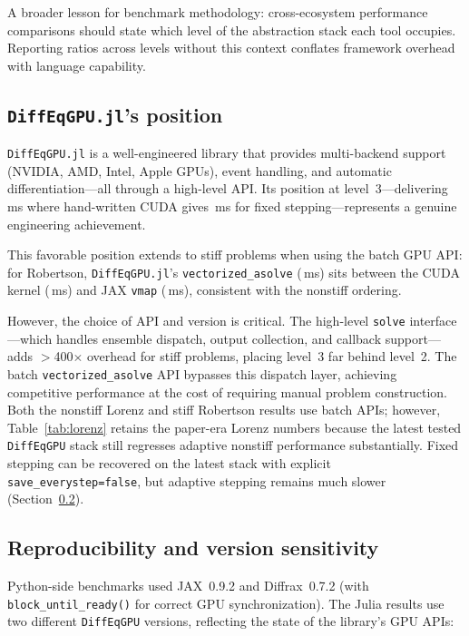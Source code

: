 \documentclass[11pt]{article}
\begin{document}
A broader lesson for benchmark methodology: cross-ecosystem
performance comparisons should state which level of the
abstraction stack each tool occupies.
Reporting ratios across levels without this context conflates
framework overhead with language capability.

\subsection{\texttt{DiffEqGPU.jl}'s position}

\texttt{DiffEqGPU.jl} is a well-engineered library that provides
multi-backend support (NVIDIA, AMD, Intel, Apple GPUs),
event handling, and automatic differentiation---all through a
high-level API.
Its position at level~3---delivering \JuliaLorenzFixed\,ms where hand-written
CUDA gives \CUDALorenzFixed\,ms for fixed stepping---represents a genuine
engineering achievement.

This favorable position extends to stiff problems when using
the batch GPU API: for Robertson, \texttt{DiffEqGPU.jl}'s
\texttt{vectorized\_asolve} (\JuliaRobertson\,ms) sits between
the CUDA kernel (\CUDARobertson\,ms) and JAX \texttt{vmap}
(\JAXRobertson\,ms), consistent with the nonstiff ordering.

However, the choice of API and version is critical.
The high-level \texttt{solve} interface---which handles
ensemble dispatch, output collection, and callback
support---adds $>$400$\times$ overhead for stiff problems,
placing level~3 far behind level~2.
The batch \texttt{vectorized\_asolve} API bypasses this
dispatch layer, achieving competitive performance at the cost
of requiring manual problem construction.
Both the nonstiff Lorenz and stiff Robertson results use batch
APIs; however, Table~\ref{tab:lorenz} retains the paper-era
Lorenz numbers because the latest tested \texttt{DiffEqGPU}
stack still regresses adaptive nonstiff performance
substantially. Fixed stepping can be recovered on the latest
stack with explicit \texttt{save\_everystep=false}, but
adaptive stepping remains much slower
(Section~\ref{sec:versions}).

\subsection{Reproducibility and version sensitivity}
\label{sec:versions}

Python-side benchmarks used JAX~0.9.2 and Diffrax~0.7.2 (with
\texttt{block\_until\_ready()} for correct GPU synchronization).
The Julia results use two different \texttt{DiffEqGPU} versions,
reflecting the state of the library's GPU APIs:
\end{document}
